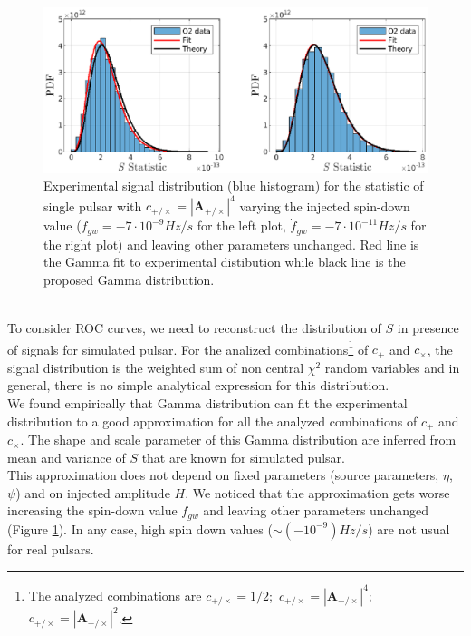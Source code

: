 \documentclass[11pt,a4paper,final]{iopart}
\begin{document}
\begin{figure}
\centering
        \includegraphics[clip,trim=45 0 10 0,scale=0.9]{spindown.eps}
    \caption{Experimental signal distribution (blue histogram) for the statistic of single pulsar with  $c_{+/\times}=|\textbf{A}_{+/\times}|^4$ varying the injected spin-down value ($\dot{f}_{gw}=-7\cdot10^{-9} Hz/s$ for the left plot, $\dot{f}_{gw}=-7\cdot10^{-11} Hz/s$ for the right plot) and leaving other parameters unchanged. Red line is the Gamma fit to experimental distibution while black line is the proposed Gamma distribution.} 
    \label{spindown}
    \vspace{-10pt}
\end{figure} 
\\To consider ROC curves, we need to reconstruct the distribution of $S$ in presence of signals for simulated pulsar. For the analized combinations\footnote{The analyzed combinations are $c_{+/\times}=1/2$;\, $c_{+/\times}=|\textbf{A}_{+/\times}|^4$;\, $c_{+/\times}=|\textbf{A}_{+/\times}|^2$.} of $c_+$ and $c_\times$, the signal distribution  is the weighted sum of non central $\chi^2$ random variables and in general, there is no simple analytical expression for this distribution.
\\We found empirically that Gamma distribution  can fit the experimental distribution to a good approximation for all the analyzed combinations of $c_+$ and $c_\times$. The shape and scale parameter of this Gamma distribution are inferred from mean and variance of $S$ that are known for simulated pulsar.
\\ This approximation does not depend on fixed parameters (source parameters, $\eta$, $\psi$) and on injected amplitude $H$. We noticed that the approximation gets worse increasing the spin-down value $\dot{f}_{gw}$ and leaving other parameters unchanged (Figure \ref{spindown}). In any case, high spin down values ($\sim (-10^{-9}) Hz/s$) are not usual for real pulsars.
\end{document}
